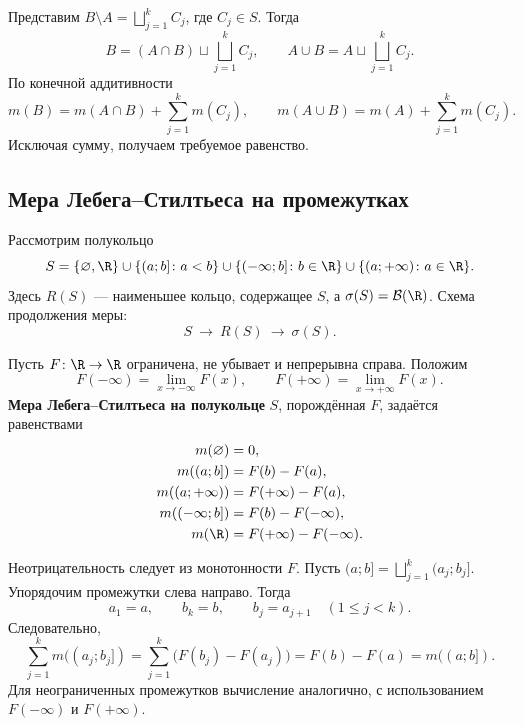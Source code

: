 \begin{Proof}
    Представим $B\setminus A=\bigsqcup_{j=1}^{k}C_j$, где $C_j\in S$.
    Тогда
    \[
        B=(A\cap B)\sqcup\bigsqcup_{j=1}^{k}C_j,
        \qquad A\cup B=A\sqcup\bigsqcup_{j=1}^{k}C_j.
    \]
    По конечной аддитивности
    \[
        m(B)=m(A\cap B)+\sum_{j=1}^{k}m(C_j),\qquad
        m(A\cup B)=m(A)+\sum_{j=1}^{k}m(C_j).
    \]
    Исключая сумму, получаем требуемое равенство.
\end{Proof}

\subsection{Мера Лебега--Стилтьеса на промежутках}

Рассмотрим полукольцо
\[
    S=\{\varnothing,\R\}\cup\{(a;b]\colon a<b\}
      \cup\{(-\infty;b]\colon b\in\R\}
      \cup\{(a;+\infty)\colon a\in\R\}.
\]
Здесь $R(S)$ --- наименьшее кольцо, содержащее $S$,
а $\sigma(S)=\mathcal{B}(\R)$. Схема продолжения меры:
\[
    S\ \longrightarrow\ R(S)\ \longrightarrow\ \sigma(S).
\]

\begin{definition}
    Пусть $F\colon\R\to\R$ ограничена, не убывает и непрерывна справа.
    Положим
    \[
        F(-\infty)=\lim_{x\to-\infty}F(x),\qquad
        F(+\infty)=\lim_{x\to+\infty}F(x).
    \]
    \textbf{Мера Лебега--Стилтьеса на полукольце} $S$, порождённая $F$,
    задаётся равенствами
    \[
        \begin{aligned}
            m(\varnothing)&=0,\\
            m((a;b])&=F(b)-F(a),\\
            m((a;+\infty))&=F(+\infty)-F(a),\\
            m((-\infty;b])&=F(b)-F(-\infty),\\
            m(\R)&=F(+\infty)-F(-\infty).
        \end{aligned}
    \]
\end{definition}

\begin{Proof}
    Неотрицательность следует из монотонности $F$.
    Пусть $(a;b]=\bigsqcup_{j=1}^{k}(a_j;b_j]$.
    Упорядочим промежутки слева направо. Тогда
    \[
        a_1=a,\qquad b_k=b,\qquad b_j=a_{j+1}\quad(1\leq j<k).
    \]
    Следовательно,
    \[
        \sum_{j=1}^{k}m((a_j;b_j])
        =\sum_{j=1}^{k}\bigl(F(b_j)-F(a_j)\bigr)
        =F(b)-F(a)=m((a;b]).
    \]
    Для неограниченных промежутков вычисление аналогично,
    с использованием $F(-\infty)$ и $F(+\infty)$.
\end{Proof}

